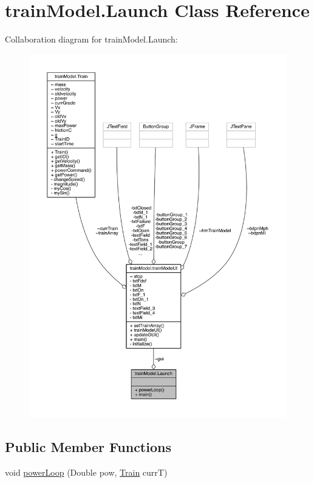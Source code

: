 \hypertarget{classtrainModel_1_1Launch}{}\section{train\+Model.\+Launch Class Reference}
\label{classtrainModel_1_1Launch}


Collaboration diagram for train\+Model.\+Launch\+:
\nopagebreak
\begin{figure}[H]
\begin{center}
\leavevmode
\includegraphics[width=350pt]{classtrainModel_1_1Launch__coll__graph}
\end{center}
\end{figure}
\subsection*{Public Member Functions}
\begin{DoxyCompactItemize}
\item 
void \hyperlink{classtrainModel_1_1Launch_aeb9937905b93f52cdfef74d098988e8d}{power\+Loop} (Double pow, \hyperlink{classtrainModel_1_1Train}{Train} currT)
\end{DoxyCompactItemize}

